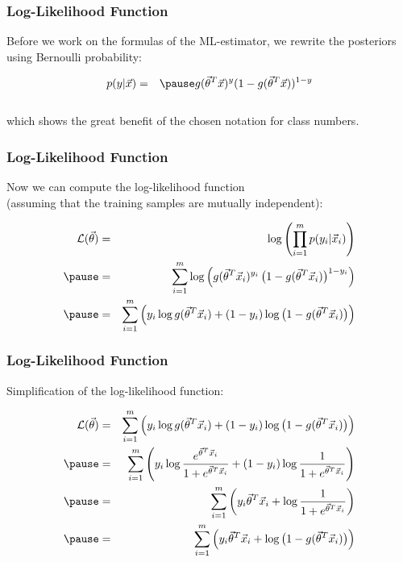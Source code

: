 \begin{frame}
  \frametitle{Log-Likelihood Function \cont}
 
  Before we work on the formulas of the ML-estimator, we rewrite the posteriors
  using Bernoulli probability:

  \begin{eqnarray*}
    p(y|\vec x) &=& \pause g(\vec \theta^T\vec x)^{y}(1-g(\vec \theta^T\vec x))^{1-y}\\[.3cm] 
  \end{eqnarray*}

  which shows the great benefit of the chosen notation for class numbers.
\end{frame}


\begin{frame}
  \frametitle{Log-Likelihood Function \cont}
 
  Now we can compute the log-likelihood function \\
  (assuming that the training samples are mutually independent):
 
  \begin{eqnarray*}
    \mathcal{L} (\vec \theta) &=& \log \left( \prod_{i=1}^m p(y_i|\vec x_i) \right) \\ \pause
                              &=& \sum_{i=1}^m \log \left( g(\vec \theta^T\vec x_i)^{y_i}\,\big(1-g(\vec \theta^T\vec x_i)\big)^{1-y_i} \right) \\ \pause
                              &=& \sum_{i=1}^m \left(y_i \log g(\vec \theta^T\vec x_i) + (1-y_i)\log\big(1-g(\vec \theta^T\vec x_i)\big) \right)
  \end{eqnarray*}
\end{frame}


\begin{frame}
  \frametitle{Log-Likelihood Function \cont}
 
  Simplification of the log-likelihood function:
 
  \begin{eqnarray*}
    \mathcal{L} (\vec \theta) 
      &=& \sum_{i=1}^m \left( y_i \log g(\vec \theta^T\vec x_i) + (1-y_i)\log\big(1-g(\vec \theta^T\vec x_i)\big) \right) \\ \pause
      &=& \sum_{i=1}^m \left( y_i \log \frac{e^{\vec \theta^T \vec x_i}}{1 + e^{\vec \theta^T \vec x_i}} + (1 - y_i) \log \frac{1}{1 + e^{\vec \theta^T \vec x_i}} \right) \\ \pause
      &=& \sum_{i=1}^m \left( y_i \vec \theta^T \vec x_i + \log \frac{1}{1 + e^{\vec \theta^T \vec x_i}} \right) \\ \pause
      &=& \sum_{i=1}^m \left( y_i \vec \theta^T \vec x_i + \log \big( 1 - g(\vec \theta^T \vec x_i) \big) \right)
  \end{eqnarray*}
\end{frame}


